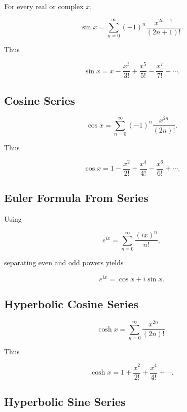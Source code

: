For every real or complex \(x\),

\[
\boxed{
\sin x
=
\sum_{n=0}^{\infty}
(-1)^n
\frac{
x^{2n+1}
}{
(2n+1)!
}.
}
\]

Thus

\[
\boxed{
\sin x
=
x
-
\frac{x^3}{3!}
+
\frac{x^5}{5!}
-
\frac{x^7}{7!}
+\cdots.
}
\]

\subsection{Cosine Series}
\label{subsec:cosine-series-reference}

\[
\boxed{
\cos x
=
\sum_{n=0}^{\infty}
(-1)^n
\frac{
x^{2n}
}{
(2n)!
}.
}
\]

Thus

\[
\boxed{
\cos x
=
1
-
\frac{x^2}{2!}
+
\frac{x^4}{4!}
-
\frac{x^6}{6!}
+\cdots.
}
\]

\subsection{Euler Formula From Series}
\label{subsec:euler-formula-series-reference}

Using

\[
e^{ix}
=
\sum_{n=0}^{\infty}
\frac{
(ix)^n
}{
n!
},
\]

separating even and odd powers yields

\[
\boxed{
e^{ix}
=
\cos x+i\sin x.
}
\]

\subsection{Hyperbolic Cosine Series}
\label{subsec:cosh-series-reference}

\[
\boxed{
\cosh x
=
\sum_{n=0}^{\infty}
\frac{
x^{2n}
}{
(2n)!
}.
}
\]

Thus

\[
\boxed{
\cosh x
=
1+\frac{x^2}{2!}
+\frac{x^4}{4!}
+\cdots.
}
\]

\subsection{Hyperbolic Sine Series}
\label{subsec:sinh-series-reference}

